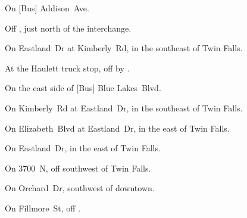 
\begin{LocationList}

On  [Bus] Addison~Ave.

Off , just north of the  interchange.

\Location{\GarageHQ \Garage}
On Eastland~Dr at Kimberly~Rd, in the southeast of Twin Falls.

At the Haulett truck stop, off  by  .

On the east side of [Bus] Blue Lakes~Blvd.

On Kimberly~Rd at Eastland~Dr, in the southeast of Twin Falls.

On Elizabeth~Blvd at Eastland~Dr, in the east of Twin Falls.

\Location{\RecruitmentAgency \Recruitment}
On Eastland~Dr, in the east of Twin Falls.

On 3700~N, off  southwest of Twin Falls.

On Orchard~Dr, southwest of downtown.

On Fillmore~St, off .

\end{LocationList}
